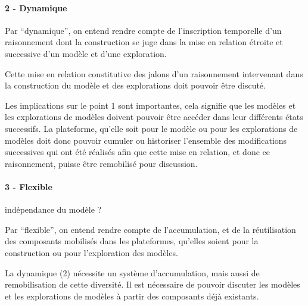 

\paragraph{2 - Dynamique}

Par \enquote{dynamique}, on entend rendre compte de l'inscription temporelle d'un raisonnement dont la construction se juge dans la mise en relation étroite et successive d'un modèle et d'une exploration. 

Cette mise en relation constitutive des jalons d'un raisonnement intervenant dans la construction du modèle et des explorations doit pouvoir être discuté.

Les implications sur le point 1 sont importantes, cela signifie que les modèles et les explorations de modèles doivent pouvoir être accéder dans leur différents états successifs. La plateforme, qu'elle soit pour le modèle ou pour les explorations de modèles doit donc pouvoir cumuler ou historiser l'ensemble des modifications successives qui ont été réalisés afin que cette mise en relation, et donc ce raisonnement, puisse être remobilisé pour discussion.

\paragraph{3 - Flexible}

indépendance du modèle ? 

Par \enquote{flexible}, on entend rendre compte de l'accumulation, et de la réutilisation des composants mobilisés dans les plateformes, qu'elles soient pour la construction ou pour l'exploration des modèles.

La dynamique (2) nécessite un système d'accumulation, mais aussi de remobilisation de cette diversité. Il est nécessaire de pouvoir discuter les modèles et les explorations de modèles à partir des composants déjà existants.

